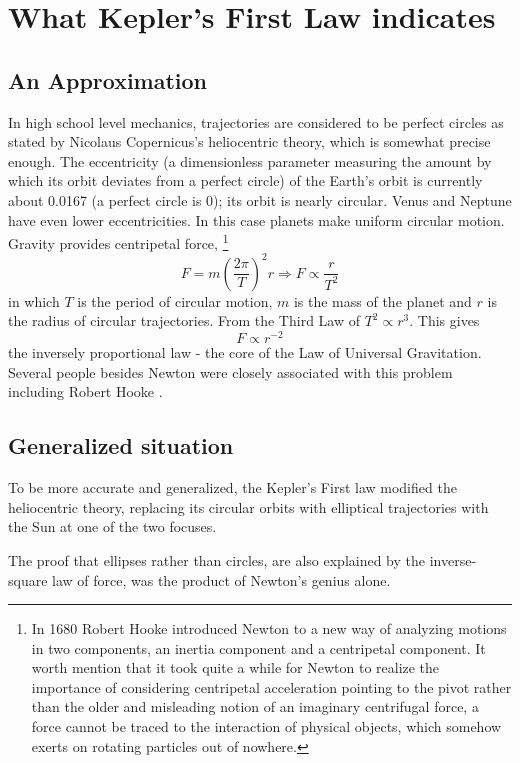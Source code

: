 \documentclass{article}
\begin{document}
\section{What Kepler's First Law indicates}

\subsection{An Approximation}

In high school level mechanics, trajectories are considered to be perfect circles as stated by Nicolaus Copernicus's heliocentric theory, which is somewhat precise enough. The eccentricity (a dimensionless parameter measuring the amount by which its orbit deviates from a perfect circle) of the Earth's orbit is currently about 0.0167 (a perfect circle is 0); its orbit is nearly circular. Venus and Neptune have even lower eccentricities. In this case planets make uniform circular motion. Gravity provides centripetal force, \footnote{In 1680 Robert Hooke introduced Newton to a new way of analyzing motions in two components, an inertia component and a centripetal component. It worth mention that it took quite a while for Newton to realize the importance of considering centripetal acceleration pointing to the pivot rather than the older and misleading notion of an imaginary centrifugal force, a force cannot be traced to the interaction of physical objects, which somehow exerts on rotating particles out of  nowhere\autocite{Cohen1981}.}
\[F = m \left( \frac{2\pi}{T} \right) ^ 2 r \Longrightarrow F \propto \frac{r}{T ^ 2} \]
in which $T$ is the period of circular motion, $m$ is the mass of the planet and $r$ is the radius of circular trajectories. From the Third Law of  $T ^ 2 \propto r ^ 3$. This gives
\[F \propto r^{-2} \]
the inversely proportional law - the core of the  Law of Universal Gravitation. Several people besides Newton were closely associated with this problem including Robert Hooke \autocite{French1971}.




\subsection{Generalized situation}

To be more accurate and generalized, the Kepler's First law modified the heliocentric theory, replacing its circular orbits with elliptical trajectories with the Sun at one of the two focuses.

The proof that ellipses rather than circles, are also explained by the inverse-square law of force, was the product of Newton's genius alone\autocite{French1971}.
\end{document}
